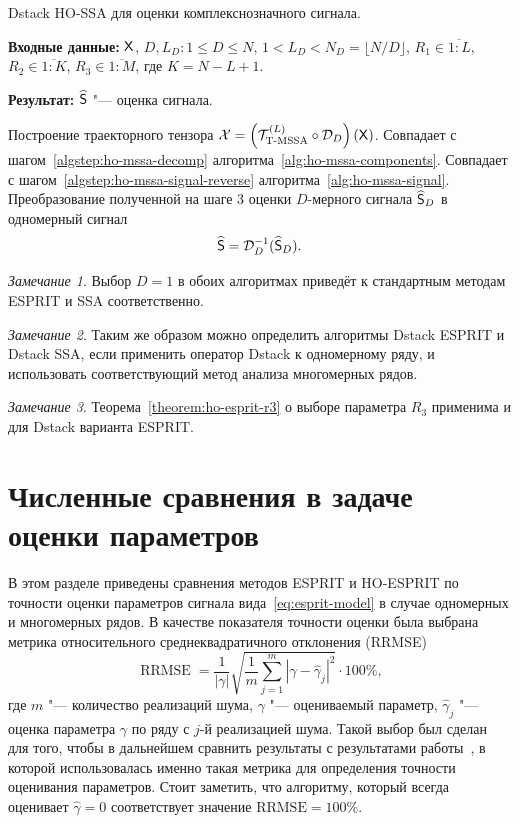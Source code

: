 \documentclass[specialist,
  substylefile=spbu_report.rtx,
subf,href,colorlinks=true, 12pt]{disser}
\theoremstyle{plain}
\theoremstyle{definition}
\theoremstyle{remark}
\newtheorem{remark}{Замечание}[section]
\newcommand{\Input}{\textbf{Входные данные: }}
\newcommand{\Output}{\textbf{Результат: }}
\begin{document}
\begin{algorithm}[!ht]
  \caption{Dstack HO-SSA для оценки комплекснозначного сигнала.}
  \label{alg:dstack-ho-ssa}
  \Input $\mathsf{X}$, $D, L_D: 1 \leqslant D \leqslant N,\, 1 < L_D < N_D =
  \lfloor N /
  D \rfloor$,
  $R_1 \in \overline{1:L}$, $R_2 \in \overline{1:K}$, $R_3 \in
  \overline{1:M}$, где $K = N-L+1$.

  \Output $\widehat{\mathsf{S}}$ "--- оценка сигнала.
  \begin{algorithmic}[1]
    \State Построение траекторного тензора $\mathcal{X} =
    \left(\mathcal{T}_{\textrm{T-MSSA}}^{(L)} \circ \mathcal{D}_D\right) (\mathsf{X})$.
    \State Совпадает с шагом~\ref{algstep:ho-mssa-decomp}
    алгоритма~\ref{alg:ho-mssa-components}.
    \State Совпадает с шагом~\ref{algstep:ho-mssa-signal-reverse}
    алгоритма~\ref{alg:ho-mssa-signal}.
    \State Преобразование полученной на шаге 3 оценки $D$-мерного сигнала
    $\widehat{\mathsf{S}}_D$ в одномерный сигнал
    \[
      \widehat{\mathsf{S}} = \mathcal{D}_D^{-1}(\widehat{\mathsf{S}}_D).
    \]
  \end{algorithmic}
\end{algorithm}
\begin{remark}
  Выбор $D=1$ в обоих алгоритмах приведёт к стандартным методам
  ESPRIT и SSA соответственно.
\end{remark}
\begin{remark}
  Таким же образом можно определить алгоритмы Dstack ESPRIT и Dstack SSA, если
  применить оператор Dstack к одномерному ряду, и использовать
  соответствующий метод
  анализа многомерных рядов.
\end{remark}
\begin{remark}
  Теорема~\ref{theorem:ho-esprit-r3} о выборе параметра $R_3$
  применима и для Dstack варианта ESPRIT.
\end{remark}

\section{Численные сравнения в задаче оценки
параметров}\label{sec:esprit-comparison}
В этом разделе приведены сравнения методов ESPRIT и HO-ESPRIT по
точности оценки параметров сигнала
вида~\eqref{eq:esprit-model} в случае одномерных и многомерных рядов.
В качестве показателя точности оценки была выбрана метрика
относительного среднеквадратичного
отклонения (RRMSE)
\begin{equation}
  \label{eq:rrmse}
  \operatorname{RRMSE} = \frac{1}{|\gamma|}\sqrt{\frac{1}{m}
  \sum_{j=1}^{m} \left|\gamma-\widehat{\gamma}_j\right|^2} \cdot 100\%,
\end{equation}
где $m$ "--- количество реализаций шума, $\gamma$ "--- оцениваемый
параметр, $\widehat{\gamma}_j$ "---
оценка параметра $\gamma$ по ряду с $j$-й реализацией шума.
Такой выбор был сделан для того, чтобы в дальнейшем сравнить
результаты с результатами
работы~\cite{hosvd-hooi-separation}, в которой использовалась именно
такая метрика для определения
точности оценивания параметров.
Стоит заметить, что алгоритму, который всегда оценивает
$\widehat{\gamma}=0$ соответствует значение $\text{RRMSE}=100\%$.
\end{document}
